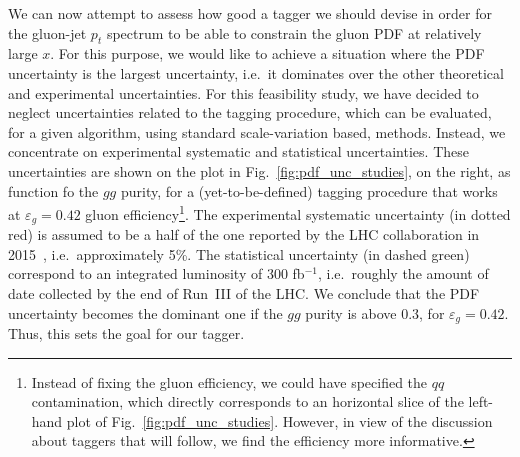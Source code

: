 We can now attempt to assess how good a tagger we should devise in order for the gluon-jet $p_t$ spectrum to be able to constrain the gluon PDF at relatively large $x$. For this purpose, we would like to achieve a situation where the PDF uncertainty is the largest uncertainty, i.e.\ it dominates over the other theoretical and experimental uncertainties. For this feasibility study, we have decided to neglect uncertainties related to the tagging procedure, which can be evaluated, for a given algorithm, using standard scale-variation based, methods. Instead, we concentrate on experimental systematic and statistical uncertainties. These uncertainties are shown on the plot in Fig.~\ref{fig:pdf_unc_studies}, on the right, as function fo the $gg$ purity, for a (yet-to-be-defined) tagging procedure that works at $\varepsilon_g=0.42$ gluon efficiency\footnote{Instead of fixing the gluon efficiency, we could have specified the $qq$ contamination, which directly corresponds to an horizontal slice of the left-hand plot of Fig.~\ref{fig:pdf_unc_studies}. However, in view of the discussion about taggers that will follow, we find the efficiency more informative.}. 
%
The experimental systematic uncertainty (in dotted red)  is assumed to be a half of the one reported by the LHC collaboration in 2015~\cite{Aaboud:2017jcu}, i.e.\ approximately 5\%. The statistical uncertainty (in dashed green) correspond to an integrated luminosity of 300 fb$^{-1}$, i.e.\ roughly the amount of date collected by the end of Run~III of the LHC.
%
We conclude that the PDF uncertainty becomes the dominant one if the $gg$ purity is above 0.3, for $\varepsilon_g=0.42$. Thus, this sets the goal for our tagger.

